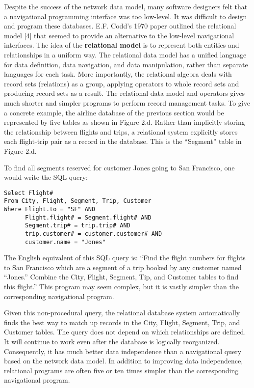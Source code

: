 \documentclass[a4paper,12pt,notitlepage,twoside,openright]{article}
\begin{document}
Despite the success of the network data model, many software designers
felt that a navigational programming interface was too low-level. It was
difficult to design and program these databases. E.F. Codd's 1970 paper
outlined the relational model {[}4{]} that seemed to provide an
alternative to the low-level navigational interfaces. The idea of the
\textbf{relational model} is to represent both entities and
relationships in a uniform way. The relational data model has a unified
language for data definition, data navigation, and data manipulation,
rather than separate languages for each task. More importantly, the
relational algebra deals with record sets (relations) as a group,
applying operators to whole record sets and producing record sets as a
result. The relational data model and operators gives much shorter and
simpler programs to perform record management tasks. To give a concrete
example, the airline database of the previous section would be
represented by five tables as shown in Figure 2.d. Rather than
implicitly storing the relationship between flights and trips, a
relational system explicitly stores each flight-trip pair as a record in
the database. This is the ``Segment'' table in Figure 2.d.

To find all segments reserved for customer Jones going to San Francisco,
one would write the SQL query:

\begin{verbatim}
Select Flight#
From City, Flight, Segment, Trip, Customer
Where Flight.to = "SF" AND
      Flight.flight# = Segment.flight# AND
      Segment.trip# = trip.trip# AND
      trip.customer# = customer.customer# AND
      customer.name = "Jones"
\end{verbatim}

The English equivalent of this SQL query is: ``Find the flight numbers
for flights to San Francisco which are a segment of a trip booked by any
customer named ``Jones.'' Combine the City, Flight, Segment, Tip, and
Customer tables to find this flight.'' This program may seem complex,
but it is vastly simpler than the corresponding navigational program.

Given this non-procedural query, the relational database system
automatically finds the best way to match up records in the City,
Flight, Segment, Trip, and Customer tables. The query does not depend on
which relationships are defined. It will continue to work even after the
database is logically reorganized. Consequently, it has much better data
independence than a navigational query based on the network data model.
In addition to improving data independence, relational programs are
often five or ten times simpler than the corresponding navigational
program.
\end{document}
